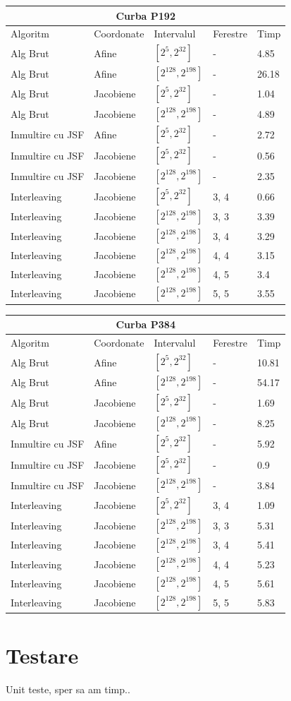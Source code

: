 \begin{tabular}{ |p{5cm}||p{3cm}|p{3cm}|p{2cm}|p{1cm}|  }
 \hline
 \multicolumn{5}{|c|}{Curba P192} \\
 \hline
  Algoritm& Coordonate &Intervalul &Ferestre &Timp\\
 \hline
 Alg Brut & Afine  &$[2^{5},2^{32}]$& - & 4.85\\
 Alg Brut & Afine  &$[2^{128},2^{198}]$& - & 26.18 \\
 Alg Brut & Jacobiene  &$[2^{5},2^{32}]$& - & 1.04 \\
 Alg Brut & Jacobiene  &$[2^{128},2^{198}]$& - & 4.89 \\
 Inmultire cu JSF & Afine  &$[2^{5},2^{32}]$& - & 2.72 \\
 Inmultire cu JSF & Jacobiene  &$[2^{5},2^{32}]$& - & 0.56 \\
 Inmultire cu JSF & Jacobiene  &$[2^{128},2^{198}]$& - & 2.35 \\
 Interleaving & Jacobiene  &$[2^{5},2^{32}]$& 3, 4 & 0.66 \\
 Interleaving & Jacobiene  &$[2^{128},2^{198}]$& 3, 3 & 3.39\\
 Interleaving & Jacobiene  &$[2^{128},2^{198}]$& 3, 4 &  3.29\\
 Interleaving & Jacobiene  &$[2^{128},2^{198}]$& 4, 4 & 3.15 \\
 Interleaving & Jacobiene  &$[2^{128},2^{198}]$& 4, 5 & 3.4 \\
 Interleaving & Jacobiene  &$[2^{128},2^{198}]$& 5, 5 & 3.55 \\
 \hline
\end{tabular}

\begin{tabular}{ |p{5cm}||p{3cm}|p{3cm}|p{2cm}|p{1cm}|  }
 \hline
 \multicolumn{5}{|c|}{Curba P384} \\
  \hline
  Algoritm& Coordonate &Intervalul &Ferestre &Timp\\
 \hline
 Alg Brut & Afine  &$[2^{5},2^{32}]$& - & 10.81\\
 Alg Brut & Afine  &$[2^{128},2^{198}]$& - & 54.17 \\
 Alg Brut & Jacobiene  &$[2^{5},2^{32}]$& - & 1.69 \\
 Alg Brut & Jacobiene  &$[2^{128},2^{198}]$& - & 8.25 \\
 Inmultire cu JSF & Afine  &$[2^{5},2^{32}]$& - & 5.92 \\
 Inmultire cu JSF & Jacobiene  &$[2^{5},2^{32}]$& - & 0.9 \\
 Inmultire cu JSF & Jacobiene  &$[2^{128},2^{198}]$& - & 3.84\\
 Interleaving & Jacobiene  &$[2^{5},2^{32}]$& 3, 4 & 1.09 \\
 Interleaving & Jacobiene  &$[2^{128},2^{198}]$& 3, 3 & 5.31 \\
 Interleaving & Jacobiene  &$[2^{128},2^{198}]$& 3, 4 & 5.41 \\
 Interleaving & Jacobiene  &$[2^{128},2^{198}]$& 4, 4 & 5.23 \\
 Interleaving & Jacobiene  &$[2^{128},2^{198}]$& 4, 5 & 5.61 \\
 Interleaving & Jacobiene  &$[2^{128},2^{198}]$& 5, 5 & 5.83	 \\
 \hline
\end{tabular}

\section{Testare}
Unit teste, sper sa am timp.. 